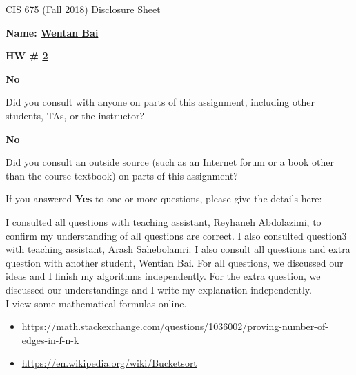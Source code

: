 \documentclass[12pt]{article}
\newcommand*\circled[1]{\tikz[baseline=(char.base)]{
            \node[shape=circle,draw,inner sep=2pt] (char) {#1};}}
\begin{document}
\begin{center}
  \Large
  CIS 675 (Fall 2018) Disclosure Sheet 
\end{center} 
\vspace*{2em}

\noindent
\textbf{\Large Name: \underline{ Wentan Bai }} 


\noindent 
\begin{minipage}[t]{1.0\linewidth}

\begin{minipage}[t]{0.25\linewidth}
\textbf{\Large
  HW \# \underline{ 2 }
} 

\end{minipage} \vspace*{3ex}




\begin{minipage}[t]{.8in}
  \textbf{\circled{Yes} \quad No}
\end{minipage}
\qquad 
\begin{minipage}[t]{5.5in}
  Did you consult with anyone on parts of this assignment, including other students, TAs, or the instructor? 
\end{minipage}
\vspace*{1ex}

\begin{minipage}[t]{.8in}
  \textbf{\circled{Yes} \quad No}
\end{minipage}
\qquad 
\begin{minipage}[t]{5.5in}
  Did you consult an outside source (such as an Internet forum or a
  book other than the course textbook) on parts of this assignment? 
\end{minipage}
\vspace*{1ex}

\noindent
  If you answered \textbf{Yes} to one or more questions, please give the details here: \vspace*{5ex} \par
  I consulted all questions with teaching assistant, Reyhaneh Abdolazimi, to confirm my understanding of all questions are correct. I also consulted question3 with teaching assistant, Arash Sahebolamri. 
  I also consult all questions and extra question with another student, Wentian Bai. For all questions, we discussed our ideas and I finish my algorithms independently. 
  For the extra question, we discussed our understandings and I write my explanation independently.  \vspace*{5ex} \\

  I view some mathematical formulas online.
  \begin{itemize}
    \item \href{url}{https://math.stackexchange.com/questions/1036002/proving-number-of-edges-in-f-n-k} 
    \item \href{url}{https://en.wikipedia.org/wiki/Bucketsort} 
  \end{itemize}

\vfill
\end{minipage}
\end{document}
